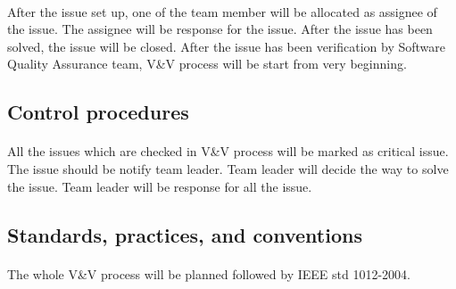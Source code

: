 \documentclass[11pt,a4paper]{article}
\begin{document}
            \paragraph{} After the issue set up, one of the team member will be allocated as assignee of the issue. The assignee will be response for the issue. After the issue has been solved, the issue will be closed. After the issue has been verification by Software Quality Assurance team, V\&V process will be start from very beginning.
        \subsection{Control procedures}
            \paragraph{} All the issues which are checked in V\&V process will be marked as critical issue. The issue should be notify team leader. Team leader will decide the way to solve the issue. Team leader will be response for all the issue.
        \subsection{Standards, practices, and conventions}
            \paragraph{} The whole V\&V process will be planned followed by IEEE std 1012-2004.
\end{document}
